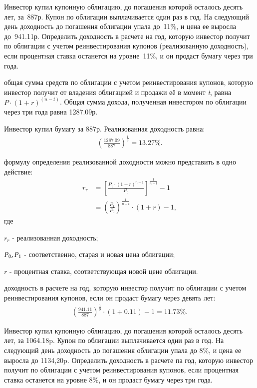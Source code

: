 \documentclass[12pt, table, a4paper,twoside]{exam}
\begin{document}
\begin{questions}
\question[10] Инвестор купил купонную облигацию, до погашения которой осталось десять лет, за~887р. Купон по облигации выплачивается один раз в год. На следующий день доходность до погашения облигации упала до~11\%, и цена ее выросла до~941.11р. Определить доходность в расчете на год, которую инвестор получит по облигации с учетом реинвестирования купонов (реализованную доходность), если процентная ставка останется на уровне~11\%, и он продаст бумагу через три года.

\begin{solution}[12em]
	
	общая сумма средств по облигации с учетом реинвестирования купонов, которую инвестор получит от владения облигацией и продажи её в момент \textit{t}, равна $P \cdot (1+r)^(n-t)$. Общая сумма дохода, полученная инвестором по облигации через три года равна 1287.09р.
	
	Инвестор купил бумагу за 887р. Реализованная доходность равна:
	\begin{align*}
	\left( \frac{1287.09}{887} \right)^{\frac{1}{3}}=13.27\%.
	\end{align*}
	
	\raggedright
	формулу определения реализованной доходности можно представить в одно действие:
	\begin{align}
	r_r&=\left[\frac{P_1 \cdot (1+r)^{n-1}}{P_0} \right]^{\frac{1}{n-t}}-1\nonumber\\
	&=\left( \frac{P_1}{P_0} \right)^{\frac{1}{n-t}} \cdot (1+r) - 1,
	\end{align}
	где
	
	$r_r$ - реализованная доходность;
	
	$P_0,\space P_1$ - соответственно, старая и новая цена облигации;
	
	$r$ - процентная ставка, соответствующая новой цене облигации.
	
	доходность в расчете на год, которую инвестор получит по облигации с учетом реинвестирования купонов, если он продаст бумагу через девять лет:
	\begin{align*}
	\left(\frac{941.11}{887}\right)^{\frac{1}{9}} \cdot (1+0.11) - 1= 11.73\%.
	\end{align*}
	\raggedright
\end{solution}

\question[10] Инвестор купил купонную облигацию, до погашения которой осталось десять лет, за 1064.18p. Купон по облигации выплачивается одни раз в год. На следующий день доходность до погашения облигации упала до 8\%, и цена ее выросла до 1134,20p. Определить доходность в расчете па год, которую инвестор получит по облигации с учетом реинвестирования купонов, если процентная ставка останется на уровне 8\%, и он продаст бумагу через три года.


\end{questions}
\end{document}
